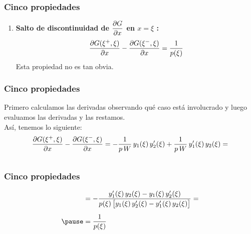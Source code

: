 \documentclass[12pt]{beamer}
\begin{document}
\begin{frame}
\frametitle{Cinco propiedades}
\begin{enumerate}[<+->]
\conti
\item \textbf{Salto de discontinuidad de $\displaystyle \pdv{G}{x}$ en $x = \xi$ :}
\pause
\begin{align*}
\pdv{G (\xi^{+}, \xi)}{x} - \pdv{G (\xi^{-}, \xi)}{x} = \dfrac{1}{p (\xi)}
\end{align*}
Esta propiedad no es tan obvia.
\seti
\end{enumerate}
\end{frame}

\begin{frame}
\frametitle{Cinco propiedades}
Primero calculamos las derivadas observando qué caso está involucrado y luego evaluamos las derivadas y las restamos.
\\
\bigskip
\pause
Así, tenemos lo siguiente:
\pause
\begin{eqnarray*}
\begin{aligned}[b]
&\pdv{G (\xi^{+}, \xi)}{x} - \pdv{G (\xi^{-}, \xi)}{x} = - \dfrac{1}{p \, W} \, y_{1} (\xi) \, {y}^{\prime}_{2} (\xi) + \dfrac{1}{p \, W} \, {y}^{\prime}_{1} (\xi) \, y_{2} (\xi) = \\[0.5em]
\end{aligned}
\end{eqnarray*}
\end{frame}

\begin{frame}
\frametitle{Cinco propiedades}
\begin{eqnarray}
\begin{aligned}[b]
&= - \dfrac{\pderivada{y}_{1} (\xi) \, y_{2} (\xi) - y_{1} (\xi) \, \pderivada{y}_{2} (\xi)}{p (\xi) \, \big[ y_{1} (\xi) \, \pderivada{y}_{2} (\xi) - \pderivada{y}_{1} (\xi) \, y_{2} (\xi) \big]} = \\[0.5em] \pause
&= \dfrac{1}{p (\xi)}
\end{aligned}
\label{eq:ecuacion_07_37}
\end{eqnarray}
\end{frame}
\end{document}
